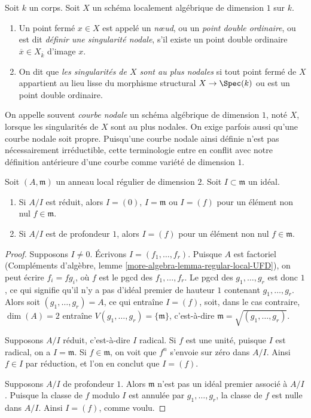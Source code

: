 \begin{definition}
\label{definition-nodal}
Soit $k$ un corps. Soit $X$ un schéma localement algébrique de dimension $1$ sur $k$. \begin{enumerate} \item Un point fermé $x \in X$ est appelé un {\it nœud}, ou un {\it point double ordinaire}, ou est dit {\it définir une singularité nodale}, s'il existe un point double ordinaire $\overline{x} \in X_{\overline{k}}$ d'image $x$. \item On dit que {\it les singularités de $X$ sont au plus nodales} si tout point fermé de $X$ appartient au lieu lisse du morphisme structural $X \to \Spec(k)$ ou est un point double ordinaire.
\end{enumerate}
\end{definition}

\noindent
On appelle souvent {\it courbe nodale} un schéma algébrique de dimension $1$, noté $X$, lorsque les singularités de $X$ sont au plus nodales. On exige parfois aussi qu'une courbe nodale soit propre. Puisqu'une courbe nodale ainsi définie n'est pas nécessairement irréductible, cette terminologie entre en conflit avec notre définition antérieure d'une courbe comme variété de dimension $1$.

\begin{lemma}
\label{lemma-reduced-quotient-regular-ring-dim-2}
Soit $(A, \mathfrak m)$ un anneau local régulier de dimension $2$. Soit $I \subset \mathfrak m$ un idéal. \begin{enumerate} \item Si $A/I$ est réduit, alors $I = (0)$, $I = \mathfrak m$ ou $I = (f)$ pour un élément non nul $f \in \mathfrak m$. \item Si $A/I$ est de profondeur $1$, alors $I = (f)$ pour un élément non nul $f \in \mathfrak m$. 
\end{enumerate}
\end{lemma}

\begin{proof}
Supposons $I \not = 0$. Écrivons $I = (f_1, \ldots, f_r)$. Puisque $A$ est factoriel (Compléments d'algèbre, lemme \ref{more-algebra-lemma-regular-local-UFD}), on peut écrire $f_i = fg_i$, où $f$ est le pgcd des $f_1, \ldots, f_r$. Le pgcd des $g_1, \ldots, g_r$ est donc $1$, ce qui signifie qu'il n'y a pas d'idéal premier de hauteur $1$ contenant $g_1, \ldots, g_r$. Alors soit $(g_1, \ldots, g_r) = A$, ce qui entraîne $I = (f)$, soit, dans le cas contraire, $\dim(A) = 2$ entraîne $V(g_1, \ldots, g_r) = \{\mathfrak m\}$, c'est-à-dire $\mathfrak m = \sqrt{(g_1, \ldots, g_r)}$.

\medskip\noindent
Supposons $A/I$ réduit, c'est-à-dire $I$ radical. Si $f$ est une unité, puisque $I$ est radical, on a $I = \mathfrak m$. Si $f \in \mathfrak m$, on voit que $f^n$ s'envoie sur zéro dans $A/I$. Ainsi $f \in I$ par réduction, et l'on en conclut que $I = (f)$.

\medskip\noindent
Supposons $A/I$ de profondeur $1$. Alors $\mathfrak m$ n'est pas un idéal premier associé à $A/I$. Puisque la classe de $f$ modulo $I$ est annulée par $g_1, \ldots, g_r$, la classe de $f$ est nulle dans $A/I$. Ainsi $I = (f)$, comme voulu.
\end{proof}

